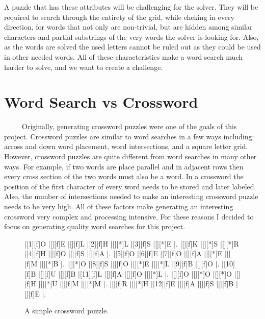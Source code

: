 \documentclass[12pt]{report}   %
\begin{document}
    A puzzle that has these attributes will be challenging for the solver. They
    will be required to search through the entirety of the grid, while cheking
    in every direction, for words that not only are non-trivial, but are 
    hidden among similar characters and partial substrings of the very words
    the solver is looking for. Also, as the words are solved the used letters
    cannot be ruled out as they could be used in other needed words. All of
    these characteristics make a word search much harder to solve, and we want
    to create a challenge.


\section*{Word Search vs Crossword}
    \ \ \ \ \ Originally, generating crossword puzzles were one of the goals of
    this project. Crossword puzzles are similar to word searches in a few ways
    including: across and down word placement, word intersections, and a square
    letter grid. However, crossword puzzles are quite different from word
    searches in many other ways. For example, if two words are place parallel
    and in adjacent rows then every cross section of the two words must also be
    a word. In a crossword the position of the first character of every word
    needs to be stored and later labeled. Also, the number of intersections
    needed to make an interesting crossword puzzle needs to be very high. All
    of these factors make generating an interesting crossword very complex and
    processing intensive. For these reasons I decided to focus on generating
    quality word searches for this project.

    \begin{figure}[h!]
        \begin{Puzzle}{7}{7}
            |[1][f]O |[][f]E |[][f]L |[2][f]H |[][*]L |[3][f]S |[][*]E |.
            |[][f]K |[][*]S |[][*]R |[4][f]H |[][f]O |[][f]S |[][f]A |.
            |[5][f]O |[6][f]E |[7][f]O |[][f]A |[][*]E |[][f]M |[][*]B |.
            |[][*]O |[8][f]S |[][f]O |[][*]E |[][*]L |[9][f]B |[][f]O |.
            |[10][f]B |[][f]U |[][f]B |[11][f]L |[][f]A |[][f]O |[][*]L |.
            |[][f]O |[][*]O |[][*]O |[][f]H |[][*]U |[][f]M |[][*]M |.
            |[][f]R |[][*]H |[12][f]E |[][f]A |[][f]S |[][f]B |[][f]E |.
        \end{Puzzle}
        \caption{A simple crossword puzzle.}
    \end{figure}
\end{document}
